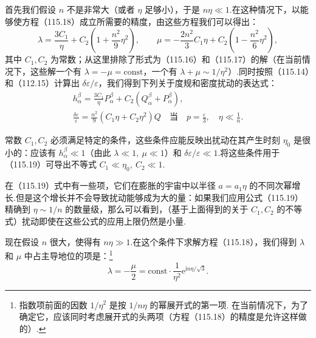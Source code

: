 首先我们假设 $n$ 不是非常大（或者 $\eta$ 足够小），于是 $n\eta\ll1$.在这种情况下，以能够使方程（115.18）成立所需要的精度，由这些方程我们可以得出：
\begin{equation*}
  \lambda=\frac{3C_{1}}{\eta}
  +C_{2}\left(1+\frac{n^{2}}{9}\eta^{2}\right),\qquad
  \mu=-\frac{2n^{2}}{3}C_{1}\eta
  +C_{2}\left(1-\frac{n^{2}}{6}\eta^{2}\right),
\end{equation*}
其中 $C_{1},C_{2}$ 为常数；从这里排除了形式为（115.16）和（115.17）的解（在当前情况下，这些解一个有 $\lambda=-\mu=\mathrm{const}$，一个有 $\lambda+\mu\sim1/\eta^{2}$）.同时按照（115.14）和（112.15）计算出 $\delta\varepsilon/\varepsilon$，我们得到下列关于度规和密度扰动的表达式：
\begin{equation}
  \begin{gathered}
    h_{\alpha}^{\beta}=\frac{3C_{1}}{\eta}P_{\alpha}^{\beta}
    +C_{2}(Q_{\alpha}^{\beta}+P_{\alpha}^{\beta}),\\
    \frac{\delta\varepsilon}{\varepsilon}
    =\frac{n^{2}}{9}(C_{1}\eta+C_{2}\eta^{2})Q
    \quad\text{当}\quad p=\frac{\varepsilon}{3},\quad
    \eta\ll\frac{1}{n}.
  \end{gathered}
\end{equation}

常数 $C_{1},C_{2}$ 必须满足特定的条件，这些条件应能反映出扰动在其产生时刻 $\eta_{0}$ 是很小的：应该有 $h_{\alpha}^{\beta}\ll1$（由此 $\lambda\ll1,\ \mu\ll1$）和 $\delta\varepsilon/\varepsilon\ll1$.将这些条件用于（115.19）可导出不等式 $C_{1}\ll\eta_{0},\ C_{2}\ll1$.

在（115.19）式中有一些项，它们在膨胀的宇宙中以半径 $a=a_{1}\eta$ 的不同次幂增长.但是这个增长并不会导致扰动能够成为大的量：如果我们应用公式（115.19）精确到 $\eta\sim1/n$ 的数量级，那么可以看到，（基于上面得到的关于 $C_{1},C_{2}$ 的不等式）扰动即使在这些公式的应用上限仍然是小量.

现在假设 $n$ 很大，使得有 $n\eta\gg1$.在这个条件下求解方程（115.18），我们得到 $\lambda$ 和 $\mu$ 中占主导地位的项是：\footnote{指数项前面的因数 $1/\eta^{2}$ 是按 $1/n\eta$ 的幂展开式的第一项. 在当前情况下，为了确定它，应该同时考虑展开式的头两项（方程（115.18）的精度是允许这样做的）.}
\begin{equation*}
  \lambda=-\frac{\mu}{2}
  =\mathrm{const}\cdot\frac{1}{\eta^{2}}
  \mathrm{e}^{\mathrm{i}n\eta/\sqrt{3}}.
\end{equation*}

